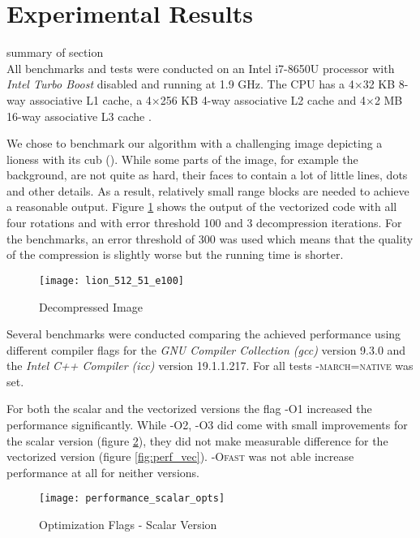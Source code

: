 \section{Experimental Results}\label{sec:exp}

summary of section\\

 All benchmarks and tests were conducted on an Intel
i7-8650U processor with \textit{Intel Turbo Boost} disabled and running at 1.9
GHz. The CPU has a 4$\times$32 KB 8-way associative L1 cache, a 4$\times$256 KB
4-way associative L2 cache and 4$\times$2 MB 16-way associative L3 cache
\cite{intel-opt-manual}.

We chose to benchmark our algorithm with a challenging image depicting a lioness
with its cub (\cite{lions}). While some parts of the image, for example the
background, are not quite as hard, their faces to contain a lot of little lines,
dots and other details. As a result, relatively small range blocks are needed to
achieve a reasonable output. Figure \ref{fig:lions} shows the output of the
vectorized code with all four rotations and with error threshold 100 and 3
decompression iterations. For the benchmarks, an error threshold of 300 was used
which means that the quality of the compression is slightly worse but the
running time is shorter.

\begin{figure}[H]
  \centering
  \texttt{[image: lion\_512\_51\_e100]}
  \caption{Decompressed Image}
  \label{fig:lions}
\end{figure}


 Several benchmarks were conducted comparing the achieved
performance using different compiler flags for the \textit{GNU Compiler
  Collection (gcc)} version 9.3.0 and the \textit{Intel C++ Compiler (icc)}
version 19.1.1.217. For all tests \textsc{-march=native} was set.

For both the scalar and the vectorized versions the flag \textsc{-O1} increased
the performance significantly. While \textsc{-O2}, \textsc{-O3} did come with
small improvements for the scalar version (figure \ref{fig:perf_scal}), they did
not make measurable difference for the vectorized version (figure
\ref{fig:perf_vec}). \textsc{-Ofast} was not able increase performance at all
for neither versions.

\begin{figure}[H]
  \texttt{[image: performance\_scalar\_opts]}
  \caption{Optimization Flags - Scalar Version}
  \label{fig:perf_scal}
\end{figure}

